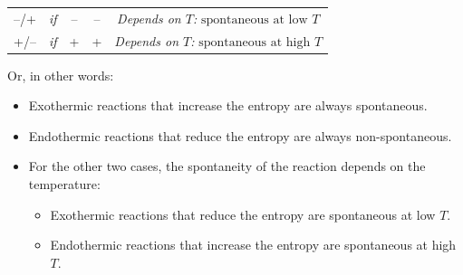 \documentclass[
  9pt,
]{extbook}
\providecommand{\tightlist}{%
  \setlength{\itemsep}{0pt}\setlength{\parskip}{0pt}}
\theoremstyle{definition}
\theoremstyle{definition}
\theoremstyle{definition}
\theoremstyle{remark}
\begin{document}
\begin{longtable}[]{@{}clccc@{}}
\begin{minipage}[t]{0.15\columnwidth}\centering
--/+\strut
\end{minipage} & \begin{minipage}[t]{0.03\columnwidth}\raggedright
\emph{if}\strut
\end{minipage} & \begin{minipage}[t]{0.15\columnwidth}\centering
--\strut
\end{minipage} & \begin{minipage}[t]{0.15\columnwidth}\centering
--\strut
\end{minipage} & \begin{minipage}[t]{0.38\columnwidth}\centering
\emph{Depends on \(T\):} \(\scriptstyle{\text{spontaneous at low } T}\)\strut
\end{minipage}\tabularnewline
\begin{minipage}[t]{0.15\columnwidth}\centering
+/--\strut
\end{minipage} & \begin{minipage}[t]{0.03\columnwidth}\raggedright
\emph{if}\strut
\end{minipage} & \begin{minipage}[t]{0.15\columnwidth}\centering
+\strut
\end{minipage} & \begin{minipage}[t]{0.15\columnwidth}\centering
+\strut
\end{minipage} & \begin{minipage}[t]{0.38\columnwidth}\centering
\emph{Depends on \(T\):} \(\scriptstyle{\text{spontaneous at high } T}\)\strut
\end{minipage}\tabularnewline
\bottomrule
\end{longtable}

Or, in other words:

\begin{itemize}
\tightlist
\item
  Exothermic reactions that increase the entropy are always spontaneous.
\item
  Endothermic reactions that reduce the entropy are always non-spontaneous.
\item
  For the other two cases, the spontaneity of the reaction depends on the temperature:

  \begin{itemize}
  \tightlist
  \item
    Exothermic reactions that reduce the entropy are spontaneous at low \(T\).
  \item
    Endothermic reactions that increase the entropy are spontaneous at high \(T\).
  \end{itemize}
\end{itemize}
\end{document}
